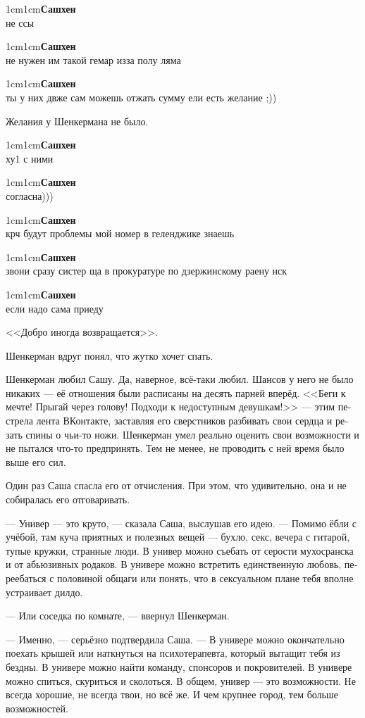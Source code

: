 \documentclass[a5paper,12pt,fleqn]{extbook}\usepackage{cooltooltips}\usepackage{polyglossia}\setdefaultlanguage[babelshorthands=true]{russian}\setotherlanguage{english}\defaultfontfeatures{Ligatures=TeX,Mapping=tex-text} \usepackage{xcolor}\definecolor{lightgray}{HTML}{bbbbbb}\color{lightgray}\newcommand{\ml}[3]{\textenglish{\textcolor{black}{#3}}}
\newcommand{\asterism}{\vspace{1em}{\centering\Large\bfseries$\ast~\ast~\ast$\par}\vspace{1em}}
\newcommand{\VKmessage}[1]{\begin{adjustwidth}{1cm}{1cm}{\vkfont \footnotesize \textcolor{VKLink}{\textbf{Сашхен}}\\#1}\end{adjustwidth}\hspace{0.1em}}
\begin{document}
\VKmessage{не ссы}

\VKmessage{не нужен им такой гемар изза полу ляма}

\VKmessage{ты у них двже сам можешь отжать сумму ели есть желание ;))}

Желания у Шенкермана не было.

\hspace{0.2em}

\VKmessage{ху1 с ними}

\VKmessage{согласна)))}

\VKmessage{крч будут проблемы мой номер в геленджике знаешь}

\VKmessage{звони сразу систер ща в прокуратуре по дзержинскому раену нск}

\VKmessage{если надо сама приеду}

<<Добро иногда возвращается>>.

Шенкерман вдруг понял, что жутко хочет спать.

\asterism

Шенкерман любил Сашу.
Да, наверное, всё-таки любил.
Шансов у него не было никаких --- её отношения были расписаны на десять парней вперёд.
<<Беги к мечте!
Прыгай через голову!
Подходи к недоступным девушкам!>> --- этим пестрела лента ВКонтакте, заставляя его сверстников разбивать свои сердца и резать спины о чьи-то ножи.
Шенкерман умел реально оценить свои возможности и не пытался что-то предпринять.
Тем не менее, не проводить с ней время было выше его сил.

Один раз Саша спасла его от отчисления.
При этом, что удивительно, она и не собиралась его отговаривать.

--- Универ --- это круто, --- сказала Саша, выслушав его идею.
--- Помимо ёбли с учёбой, там куча приятных и полезных вещей --- бухло, секс, вечера с гитарой, тупые кружки, странные люди.
В универ можно съебать от серости мухосранска и от абьюзивных родаков.
В универе можно встретить единственную любовь, переебаться с половиной общаги или понять, что в сексуальном плане тебя вполне устраивает дилдо.

--- Или соседка по комнате, --- ввернул Шенкерман.

--- Именно, --- серьёзно подтвердила Саша.
--- В универе можно окончательно поехать крышей или наткнуться на психотерапевта, который вытащит тебя из бездны.
В универе можно найти команду, спонсоров и покровителей.
В универе можно спиться, скуриться и сколоться.
В общем, универ --- это возможности.
Не всегда хорошие, не всегда твои, но всё же.
И чем крупнее город, тем больше возможностей.
\end{document}
